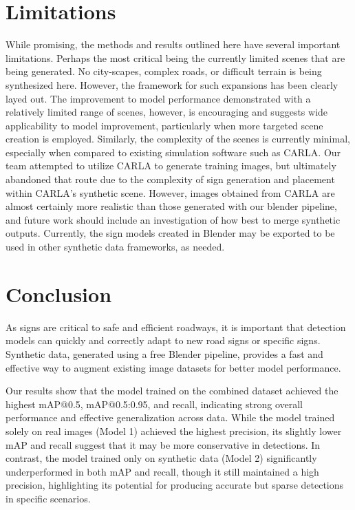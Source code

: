 \documentclass[journal]{IEEEtran}
\begin{document}
\section{Limitations}
While promising, the methods and results outlined here have several important limitations. Perhaps the most critical being the currently limited scenes that are being generated. No city-scapes, complex roads, or difficult terrain is being synthesized here. However, the framework for such expansions has been clearly layed out. The improvement to model performance demonstrated with a relatively limited range of scenes, however, is encouraging and suggests wide applicability to model improvement, particularly when more targeted scene creation is employed. Similarly, the complexity of the scenes is currently minimal, especially when compared to existing simulation software such as CARLA. Our team attempted to utilize CARLA to generate training images, but ultimately abandoned that route due to the complexity of sign generation and placement within CARLA's synthetic scene. However, images obtained from CARLA are almost certainly more realistic than those generated with our blender pipeline, and future work should include an investigation of how best to merge synthetic outputs. Currently, the sign models created in Blender may be exported to be used in other synthetic data frameworks, as needed.


\section{Conclusion}
As signs are critical to safe and efficient roadways, it is important that detection models can quickly and correctly adapt to new road signs or specific signs. Synthetic data, generated using a free Blender pipeline, provides a fast and effective way to augment existing image datasets for better model performance.

Our results show that the model trained on the combined dataset achieved the highest mAP@0.5, mAP@0.5:0.95, and recall, indicating strong overall performance and effective generalization across data. While the model trained solely on real images (Model 1) achieved the highest precision, its slightly lower mAP and recall suggest that it may be more conservative in detections. In contrast, the model trained only on synthetic data (Model 2) significantly underperformed in both mAP and recall, though it still maintained a high precision, highlighting its potential for producing accurate but sparse detections in specific scenarios.
\end{document}
